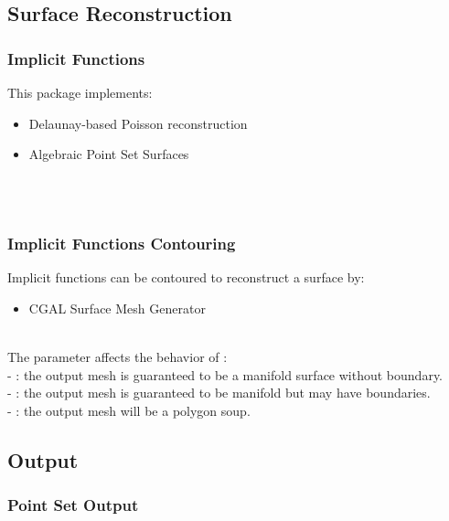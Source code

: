 \subsection{Surface Reconstruction}

\subsubsection{Implicit Functions}

This package implements:

\begin{itemize}
\item Delaunay-based Poisson reconstruction \cite{Kazhdan06}
\item Algebraic Point Set Surfaces \cite{Guennebaud07}
\end{itemize}

  \\
  \\


\subsubsection{Implicit Functions Contouring}

Implicit functions can be contoured to reconstruct a surface by:

\begin{itemize}
\item CGAL Surface Mesh Generator~\cite{cgal:ry-gsddrm-06,cgal:bo-pgsms-05}
\end{itemize}

  \\

The parameter  affects the behavior of : \\
- : the output mesh is guaranteed to be a manifold
surface without boundary.\\
- : the output mesh is guaranteed to be
manifold but may have boundaries.\\
- : the output mesh will be a polygon soup.


\subsection{Output}

\subsubsection{Point Set Output}

